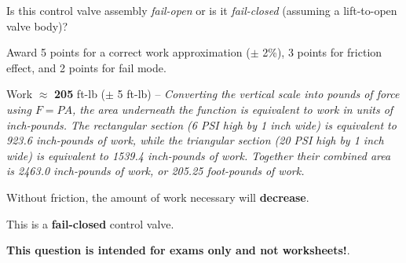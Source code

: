 \vskip 10pt

Is this control valve assembly {\it fail-open} or is it {\it fail-closed} (assuming a lift-to-open valve body)?







Award 5 points for a correct work approximation ($\pm$ 2\%), 3 points for friction effect, and 2 points for fail mode.

\vskip 10pt

Work $\approx$ {\bf 205} ft-lb ($\pm$ 5 ft-lb) -- {\it Converting the vertical scale into pounds of force using $F = PA$, the area underneath the function is equivalent to work in units of inch-pounds.  The rectangular section (6 PSI high by 1 inch wide) is equivalent to 923.6 inch-pounds of work, while the triangular section (20 PSI high by 1 inch wide) is equivalent to 1539.4 inch-pounds of work.  Together their combined area is 2463.0 inch-pounds of work, or 205.25 foot-pounds of work.}

\vskip 10pt

Without friction, the amount of work necessary will {\bf decrease}.

\vskip 10pt

This is a {\bf fail-closed} control valve.







{\bf This question is intended for exams only and not worksheets!}.



